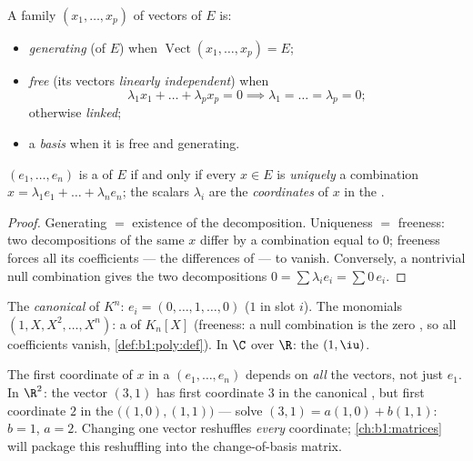 \begin{definition}\label{def:b1:vspaces:free}
A family $(x_1, \dots, x_p)$ of vectors of $E$ is:
\begin{itemize}
  \item \emph{generating} (of $E$) when
        $\operatorname{Vect}(x_1,\dots,x_p) = E$;
  \item \emph{free} (its vectors \emph{linearly
        independent}) when
        \[
        \lambda_1 x_1 + \dots + \lambda_p x_p = 0
        \implies \lambda_1 = \dots = \lambda_p = 0 ;
        \]
        otherwise \emph{linked};
  \item a \emph{basis} when it is free and generating.
\end{itemize}
\end{definition}

\begin{proposition}[Coordinates]\label{prop:b1:vspaces:coordinates}
$(e_1, \dots, e_n)$ is a  of $E$ if and only if every $x \in E$
is \emph{uniquely} a combination $x = \lambda_1 e_1 + \dots +
\lambda_n e_n$; the scalars $\lambda_i$ are the
\emph{coordinates} of $x$ in the .
\end{proposition}

\begin{proof}
Generating $=$ existence of the decomposition. Uniqueness $=$
freeness: two decompositions of the same $x$ differ by a combination
equal to $0$; freeness forces all its coefficients --- the
differences of  --- to vanish. Conversely, a nontrivial
null combination gives the two decompositions $0 = \sum \lambda_i
e_i = \sum 0\,e_i$.
\end{proof}

\begin{example}\label{ex:b1:vspaces:bases}
The \emph{canonical } of $K^n$: $e_i = (0, \dots, 1, \dots, 0)$
($1$ in slot $i$). The monomials $(1, X, X^2, \dots, X^n)$: a 
of $K_n[X]$ (freeness: a null combination is the zero , so
all coefficients vanish, \cref{def:b1:poly:def}). In
$\C$ over $\R$: the  $(1, \iu)$.
\end{example}

\begin{remark}
\label{rem:b1:vspaces:teameffort}
The first coordinate of $x$ in a  $(e_1, \dots, e_n)$
depends on \emph{all} the  vectors, not just $e_1$. In
$\R^2$: the vector $(3, 1)$ has first coordinate $3$ in the
canonical , but first coordinate $2$ in the 
$\bigl((1,0), (1,1)\bigr)$ --- solve $(3,1) = a(1,0) + b(1,1)$:
$b = 1$, $a = 2$. Changing one  vector reshuffles
\emph{every} coordinate; \cref{ch:b1:matrices} will package this
reshuffling into the change-of-basis matrix.
\end{remark}


